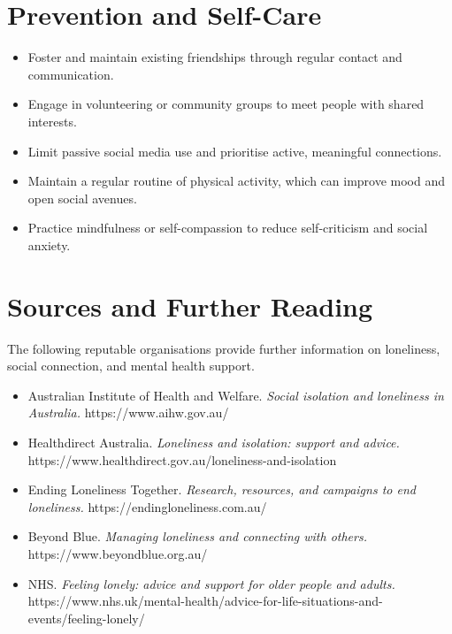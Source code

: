 \section*{Prevention and Self-Care}
\begin{itemize}
    \item Foster and maintain existing friendships through regular contact and communication.
    \item Engage in volunteering or community groups to meet people with shared interests.
    \item Limit passive social media use and prioritise active, meaningful connections.
    \item Maintain a regular routine of physical activity, which can improve mood and open social avenues.
    \item Practice mindfulness or self-compassion to reduce self-criticism and social anxiety.
\end{itemize}

\section*{Sources and Further Reading}
The following reputable organisations provide further information on loneliness, social connection, and mental health support.
\begin{itemize}
    \item Australian Institute of Health and Welfare. \textit{Social isolation and loneliness in Australia.} https://www.aihw.gov.au/
    \item Healthdirect Australia. \textit{Loneliness and isolation: support and advice.} https://www.healthdirect.gov.au/loneliness-and-isolation
    \item Ending Loneliness Together. \textit{Research, resources, and campaigns to end loneliness.} https://endingloneliness.com.au/
    \item Beyond Blue. \textit{Managing loneliness and connecting with others.} https://www.beyondblue.org.au/
    \item NHS. \textit{Feeling lonely: advice and support for older people and adults.} https://www.nhs.uk/mental-health/advice-for-life-situations-and-events/feeling-lonely/
\end{itemize}
